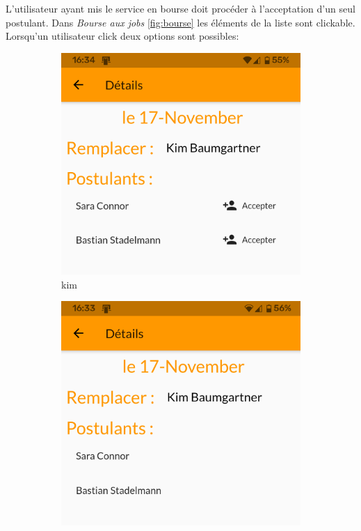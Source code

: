     L'utilisateur ayant mis le service en bourse doit procéder à l'acceptation
    d'un seul postulant. Dans \textit{Bourse aux jobs} \ref{fig:bourse} les éléments de 
    la liste sont clickable. Lorsqu'un utilisateur click deux options sont possibles:

    \begin{figure}[!h]
        \centering
        \begin{subfigure}{.3\textwidth}
            \centering
            \includegraphics[width=0.9\linewidth]{screenshots/scenario_03/detail_auth.png}
            \caption{kim}
            \label{fig:detail_auth}
        \end{subfigure}
        \begin{subfigure}{.3\textwidth}
            \centering
            \includegraphics[width=0.9\linewidth]{screenshots/scenario_03/detail_non_auth.png}

\end{subfigure}
\end{figure}
